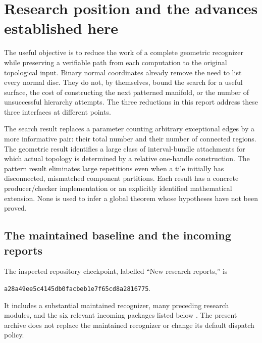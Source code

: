\section{Research position and the advances established here}
\label{sec:position}

The useful objective is to reduce the work of a complete geometric recognizer
while preserving a verifiable path from each computation to the original
topological input. Binary normal coordinates already remove the need to list
every normal disc. They do not, by themselves, bound the search for a useful
surface, the cost of constructing the next patterned manifold, or the number
of unsuccessful hierarchy attempts. The three reductions in this report
address these three interfaces at different points.

The search result replaces a parameter counting arbitrary exceptional edges
by a more informative pair: their total number and their number of connected
regions. The geometric result identifies a large class of interval-bundle
attachments for which actual topology is determined by a relative one-handle
construction. The pattern result eliminates large repetitions even when a
tile initially has disconnected, mismatched component partitions. Each result
has a concrete producer/checker implementation or an explicitly identified
mathematical extension. None is used to infer a global theorem whose
hypotheses have not been proved.

\subsection{The maintained baseline and the incoming reports}

The inspected repository checkpoint, labelled ``New research reports,'' is
\begin{center}\small\texttt{a28a49ee5c4145db0facbeb1e7f65cd8a2816775}.\end{center}
It includes a substantial maintained recognizer, many preceding
research modules, and the six relevant incoming packages listed below
\cite{repo,repo-parallelity,incoming-cancellation,incoming-reductions,
incoming-marked,incoming-homology,incoming-corners,incoming-four-copy}.
The present archive does not replace the maintained recognizer or change its
default dispatch policy.

